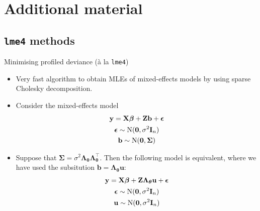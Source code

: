 \documentclass{beamer}\usepackage[]{graphicx}\usepackage[]{color}
\newcommand{\N}{\text{\normalfont N}}
\begin{document}
\section{Additional material}

\subsection[lme4 methods]{\texttt{lme4} methods}

\begin{frame}{Minimising profiled deviance (à la \texttt{lme4})}
	\begin{itemize}
		\item Very fast algorithm to obtain MLEs of mixed-effects models by using sparse Cholesky decomposition.
		\item Consider the mixed-effects model
		\begin{align*}
			\begin{gathered}
				\mathbf y = \mathbf X\boldsymbol{\beta} + \mathbf Z\mathbf b + \boldsymbol{\epsilon} \\
				\boldsymbol{\epsilon} \sim \N (\mathbf 0, \sigma^2 \mathbf I_n) \\
				\mathbf b \sim \N (\mathbf 0, \boldsymbol{\Sigma})
			\end{gathered}
		\end{align*}
		\item Suppose that $\boldsymbol{\Sigma} = \sigma^2\boldsymbol{\Lambda}_{\boldsymbol{\theta}}\boldsymbol{\Lambda}_{\boldsymbol{\theta}}^\top$. Then the following model is equivalent, where we have used the subsitution $\mathbf b = \boldsymbol{\Lambda}_{\boldsymbol{\theta}}\mathbf u$:
		\begin{align*}
			\begin{gathered}
				\mathbf y = \mathbf X\boldsymbol{\beta} + \mathbf Z\boldsymbol{\Lambda}_{\boldsymbol{\theta}}\mathbf u + \boldsymbol{\epsilon} \\
				\boldsymbol{\epsilon} \sim \N (\mathbf 0, \sigma^2 \mathbf I_n) \\
				\mathbf u \sim \N (\mathbf 0, \sigma^2 \mathbf I_n)
			\end{gathered}
		\end{align*}
	\end{itemize}
\end{frame}
\end{document}
